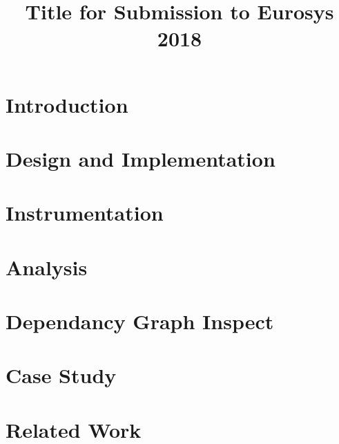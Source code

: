 \documentclass[10pt,preprint]{sigplanconf-eurosys}
\date{}
\begin{document}
\title{Title for Submission to Eurosys 2018} 
\maketitle

\begin{abstract}

\end{abstract}

\section{Introduction}


\section{Design and Implementation}


\section{Instrumentation}


\section{Analysis}


\section{Dependancy Graph Inspect}


\section{Case Study}


\section{Related Work}




% 
\end{document}
